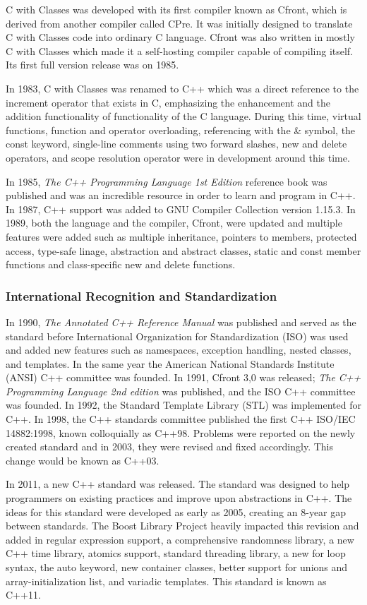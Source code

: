 \documentclass[12pt]{article}
\begin{document}
C with Classes was developed with its first compiler known as Cfront, which is derived from another compiler called CPre. It was initially designed to translate C with Classes code into ordinary C language. Cfront was also written in mostly C with Classes which made it a self-hosting compiler capable of compiling itself. Its first full version release was on 1985.

In 1983, C with Classes was renamed to C++ which was a direct reference to the increment operator that exists in C, emphasizing the enhancement and the addition functionality of functionality of the C language. During this time, virtual functions, function and operator overloading, referencing with the \& symbol, the const keyword, single-line comments using two forward slashes, new and delete operators, and scope resolution operator were in development around this time. 

In 1985, \textit{The C++ Programming Language 1st Edition} reference book was published and was an incredible resource in order to learn and program in C++. In 1987, C++ support was added to GNU Compiler Collection version 1.15.3. In 1989, both the language and the compiler, Cfront, were updated and multiple features were added such as multiple inheritance, pointers to members, protected access, type-safe linage, abstraction and abstract classes, static and const member functions and class-specific new and delete functions. 

\subsubsection{International Recognition and Standardization}
In 1990, \textit{The Annotated C++ Reference Manual} was published and served as the standard before International Organization for Standardization (ISO) was used and added new features such as namespaces, exception handling, nested classes, and templates. In the same year the American National Standards Institute (ANSI) C++ committee was founded. In 1991, Cfront 3,0 was released; \textit{The C++ Programming Language 2nd edition} was published, and the ISO C++ committee was founded. In 1992, the Standard Template Library (STL) was implemented for C++. In 1998, the C++ standards committee published the first C++ ISO/IEC 14882:1998, known colloquially as C++98. Problems were reported on the newly created standard and in 2003, they were revised and fixed accordingly. This change would be known as C++03.

In 2011, a new C++ standard was released. The standard was designed to help programmers on existing practices and improve upon abstractions in C++. The ideas for this standard were developed as early as 2005, creating an 8-year gap between standards. The Boost Library Project heavily impacted this revision and added in regular expression support, a comprehensive randomness library, a new C++ time library, atomics support, standard threading library, a new for loop syntax, the auto keyword, new container classes, better support for unions and array-initialization list, and variadic templates. This standard is known as C++11.
\end{document}
